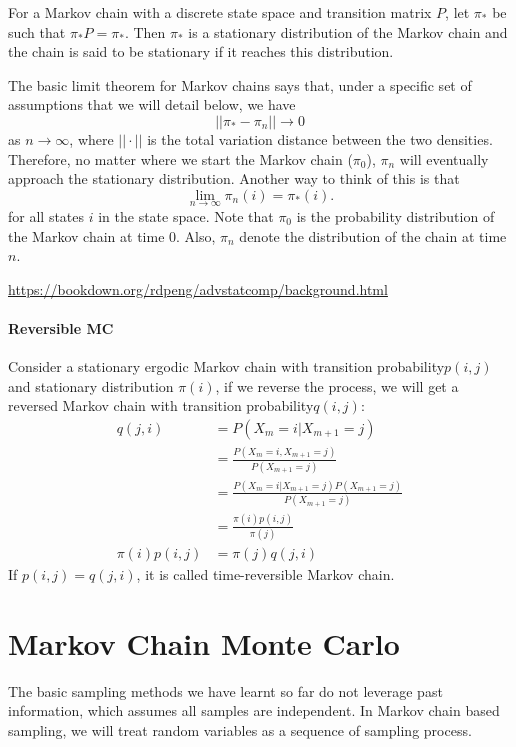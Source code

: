 For a Markov chain with a discrete state space and transition matrix $P$, let $\pi_*$ be such that $\pi_*P=\pi_*$. Then $\pi_*$ is a stationary distribution of the Markov chain and the chain is said to be stationary if it reaches this distribution.

The basic limit theorem for Markov chains says that, under a specific set of assumptions that we will detail below, we have 
$$||\pi_*-\pi_n|| \to 0$$
as $n\to\infty$, where $||\cdot||$ is the total variation distance between the two densities. Therefore, no matter where we start the Markov chain ($\pi_0$), $\pi_n$ will eventually approach the stationary distribution. Another way to think of this is that 
$$\lim_{n\to\infty}\pi_n(i)=\pi_*(i).$$
for all states $i$ in the state space. Note that $\pi_0$ is the probability distribution of the Markov chain at time 0. Also, $\pi_n$ denote the distribution of the chain at time $n$.

\url{https://bookdown.org/rdpeng/advstatcomp/background.html}


\paragraph{Reversible MC}
Consider a stationary ergodic Markov chain with transition probability$p(i, j)$ and stationary distribution $\pi(i)$, if we reverse the process, we will get a reversed Markov chain with transition probability$q(i, j)$: 
\begin{align*}
	q(j,i) &= P(X_m=i|X_{m+1}=j)\\
		   &= \frac{P(X_m=i,X_{m+1}=j)}{P(X_{m+1}=j)}\\
		   &= \frac{P(X_m=i|X_{m+1}=j)P(X_{m+1}=j)}{P(X_{m+1}=j)}\\
		   &= \frac{\pi(i)p(i,j)}{\pi(j)}\\
	\pi(i)p(i,j) &= \pi(j)q(j,i)
\end{align*}
If $p(i,j) = q(j,i)$, it is called time-reversible Markov chain. 


\section{Markov Chain Monte Carlo}
The basic sampling methods we have learnt so far do not leverage past information, which assumes all samples are independent. In Markov chain based sampling, we will treat random variables as a sequence of sampling process. 

